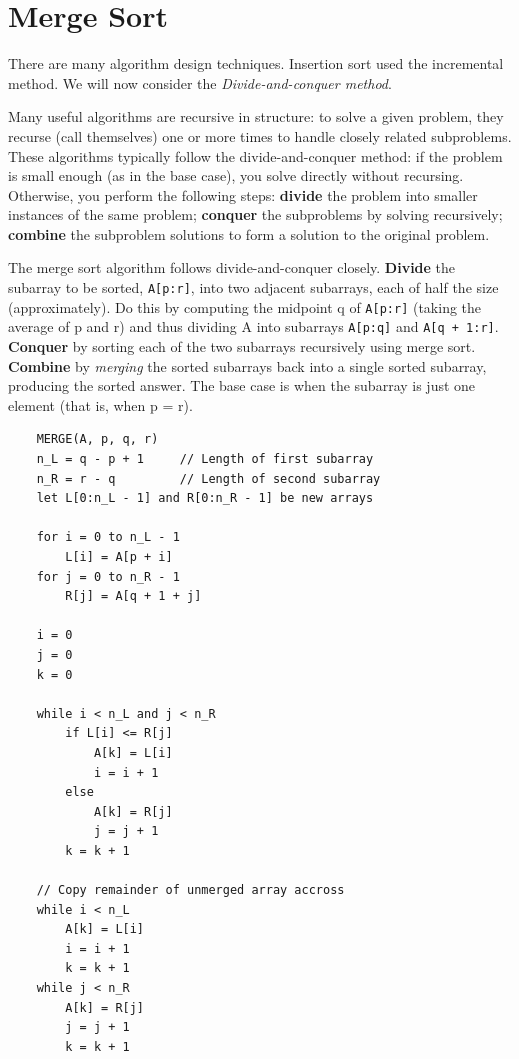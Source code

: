 \documentclass[12pt]{article}
\begin{document}
\section{Merge Sort}
There are many algorithm design techniques. Insertion sort used the incremental method. We will now consider
the \textit{Divide-and-conquer method}.

Many useful algorithms are recursive in structure: to solve a given problem, they recurse (call themselves) one
or more times to handle closely related subproblems. These algorithms typically follow the divide-and-conquer method:
if the problem is small enough (as in the base case), you solve directly
without recursing. Otherwise, you perform the following steps: \textbf{divide} the problem into smaller instances
of the same problem; \textbf{conquer} the subproblems by solving recursively; \textbf{combine} the subproblem
solutions to form a solution to the original problem.

The merge sort algorithm follows divide-and-conquer closely. \textbf{Divide} the subarray to be sorted, \texttt{A[p:r]},
into two adjacent subarrays, each of half the size (approximately). Do this by computing the midpoint q of \texttt{A[p:r]}
(taking the average of p and r) and thus dividing A into subarrays \texttt{A[p:q]} and \texttt{A[q + 1:r]}. \textbf{Conquer} by sorting each of
the two subarrays recursively using merge sort. \textbf{Combine} by \textit{merging} the sorted subarrays back into a single sorted subarray, producing the sorted answer.
The base case is when the subarray is just one element (that is, when p = r).
\begin{lstlisting}
    MERGE(A, p, q, r)
    n_L = q - p + 1     // Length of first subarray
    n_R = r - q         // Length of second subarray
    let L[0:n_L - 1] and R[0:n_R - 1] be new arrays

    for i = 0 to n_L - 1
        L[i] = A[p + i]
    for j = 0 to n_R - 1
        R[j] = A[q + 1 + j]

    i = 0
    j = 0
    k = 0

    while i < n_L and j < n_R
        if L[i] <= R[j]
            A[k] = L[i]
            i = i + 1
        else
            A[k] = R[j]
            j = j + 1
        k = k + 1

    // Copy remainder of unmerged array accross
    while i < n_L
        A[k] = L[i]
        i = i + 1
        k = k + 1
    while j < n_R
        A[k] = R[j]
        j = j + 1
        k = k + 1
\end{lstlisting}
\end{document}
